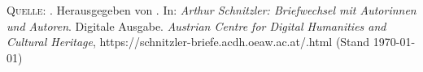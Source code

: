 \footnotesize

\begin{ledgroupsized}[t]{11.5cm}
\end{ledgroupsized}

\bigskip


\printindex[pw]


\vspace{3cm}

\vfill

\footnotesize
\textsc{Quelle}: \titel. Herausgegeben von {\editorInnen}. In: \emph{Arthur Schnitzler: Briefwechsel mit Autorinnen und Autoren}. Digitale Ausgabe. \emph{Austrian Centre for Digital Humanities and Cultural Heritage}, https://schnitzler-briefe.acdh.oeaw.ac.at/{\dateiname}.html (Stand \today)


